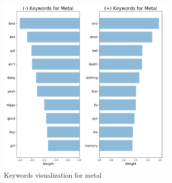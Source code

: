 \documentclass[a4paper,11pt]{article}
\begin{document}
\begin{figure}[h]
\begin{center}
\includegraphics[width=0.8\textwidth]{./img/metal-keywords.png}
\end{center}
\caption{Keywords visualization for metal}
\label{label-kw-metal}
\end{figure}

\end{document}
